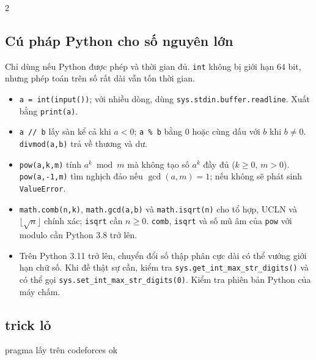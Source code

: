 \begin{multicols}{2}
\subsection{Cú pháp Python cho số nguyên lớn}
Chỉ dùng nếu Python được phép và thời gian đủ. \texttt{int} không bị
giới hạn $64$ bit, nhưng phép toán trên số rất dài vẫn tốn thời gian.
\begin{itemize}
\setlength{\itemsep}{2pt}
\item \texttt{a = int(input())}; với nhiều dòng, dùng
      \texttt{sys.stdin.buffer.readline}. Xuất bằng \texttt{print(a)}.
\item \texttt{a // b} lấy sàn kể cả khi $a<0$;
      \texttt{a \% b} bằng $0$ hoặc cùng dấu với $b$ khi $b\ne0$.
      \texttt{divmod(a,b)} trả về thương và dư.
\item \texttt{pow(a,k,m)} tính $a^k\bmod m$ mà không tạo số $a^k$
      đầy đủ ($k\ge0$, $m>0$). \texttt{pow(a,-1,m)} tìm nghịch đảo
      nếu $\gcd(a,m)=1$; nếu không sẽ phát sinh \texttt{ValueError}.
\item \texttt{math.comb(n,k)}, \texttt{math.gcd(a,b)} và
      \texttt{math.isqrt(n)} cho tổ hợp, UCLN và
      $\lfloor\sqrt n\rfloor$ chính xác; \texttt{isqrt} cần $n\ge0$.
      \texttt{comb}, \texttt{isqrt} và số mũ âm của \texttt{pow}
      với modulo cần Python 3.8 trở lên.
\item Trên Python 3.11 trở lên, chuyển đổi số thập phân cực dài có thể
      vướng giới hạn chữ số. Khi đề thật sự cần, kiểm tra
      \texttt{sys.get\_int\_max\_str\_digits()} và có thể gọi
      \texttt{sys.set\_int\_max\_str\_digits(0)}.
      Kiểm tra phiên bản Python của máy chấm.
\end{itemize}

\subsection{trick lỏ}
pragma lấy trên codeforces ok

\end{multicols}
\endgroup
